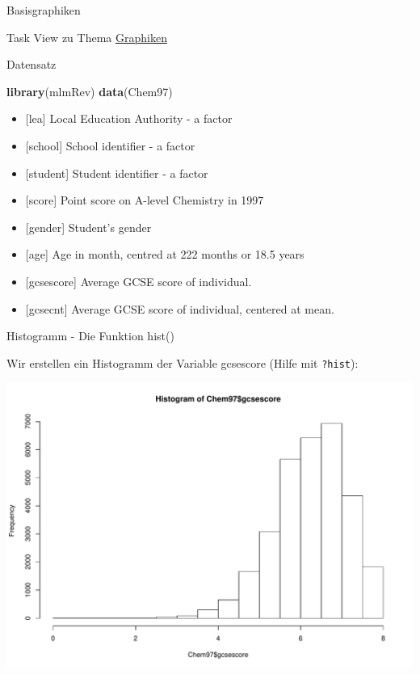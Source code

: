 \documentclass[ignorenonframetext,]{beamer}
\newenvironment{Shaded}{}{}
\newcommand{\KeywordTok}[1]{\textcolor[rgb]{0.00,0.44,0.13}{\textbf{{#1}}}}
\newcommand{\NormalTok}[1]{{#1}}
\providecommand{\tightlist}{%
\setlength{\itemsep}{0pt}\setlength{\parskip}{0pt}}
\begin{document}
\begin{frame}[fragile]{Basisgraphiken}
\begin{block}{Task View zu Thema
\href{https://cran.r-project.org/web/views/Graphics.html}{Graphiken}}
\end{block}

\begin{block}{Datensatz}

\begin{Shaded}
\begin{Highlighting}[]
\KeywordTok{library}\NormalTok{(mlmRev)}
\KeywordTok{data}\NormalTok{(Chem97)}
\end{Highlighting}
\end{Shaded}

\begin{itemize}
\tightlist
\item
  {[}lea{]} Local Education Authority - a factor
\item
  {[}school{]} School identifier - a factor
\item
  {[}student{]} Student identifier - a factor
\item
  {[}score{]} Point score on A-level Chemistry in 1997
\item
  {[}gender{]} Student's gender
\item
  {[}age{]} Age in month, centred at 222 months or 18.5 years
\item
  {[}gcsescore{]} Average GCSE score of individual.
\item
  {[}gcsecnt{]} Average GCSE score of individual, centered at mean.
\end{itemize}

\end{block}

\begin{block}{Histogramm - Die Funktion hist()}

Wir erstellen ein Histogramm der Variable gcsescore (Hilfe mit
\texttt{?hist}):

\begin{Shaded}
\end{Shaded}

\includegraphics{R_intern_files/figure-beamer/unnamed-chunk-149-1.pdf}


\end{block}
\end{frame}
\end{document}
